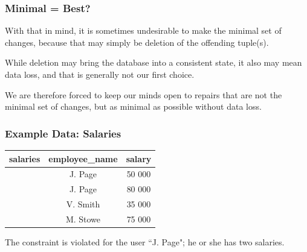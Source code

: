 \begin{frame}
\frametitle{Minimal = Best?}

With that in mind, it is sometimes undesirable to make the minimal set of changes, because that may simply be deletion of the offending tuple(s). 

While deletion may bring the database into a consistent state, it also may mean data loss, and that is generally not our first choice. 

We are therefore forced to keep our minds open to repairs that are not the minimal set of changes, but as minimal as possible without data loss.


\end{frame}


\begin{frame}
\frametitle{Example Data: Salaries}


\begin{table}[h]\begin{center}
        \begin{tabular}{r | c  c} 
					salaries & employee\_name & salary \\ \hline
	           		 & J. Page  & 50 000 \\ 
	         		 & J. Page  & 80 000 \\ 
					 & V. Smith & 35 000 \\ 
					 & M. Stowe & 75 000 \\ 
        \end{tabular}
\end{center}\end{table}

The constraint is violated for the user ``J. Page"; he or she has two salaries.

\end{frame}

